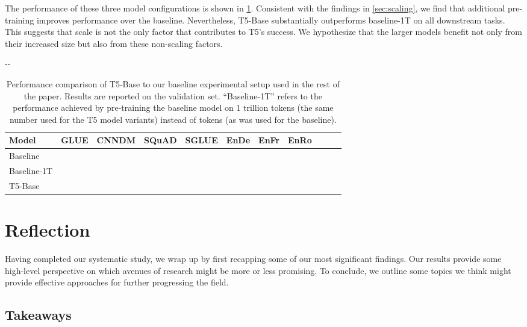 \documentclass[twoside,11pt]{article}
\newlength{\offsetpage}
\newenvironment{widepage}{\begin{adjustwidth}{-\offsetpage}{-\offsetpage}\addtolength{\textwidth}{2\offsetpage}}{\end{adjustwidth}}
\newcommand{\bsl}{\makebox[0pt][r]{\raisebox{0.05em}{}}}
\begin{document}
The performance of these three model configurations is shown in \cref{tab:insight_impact}.
Consistent with the findings in \cref{sec:scaling}, we find that additional pre-training improves performance over the baseline.
Nevertheless, T5-Base substantially outperforms baseline-1T on all downstream tasks.
This suggests that scale is not the only factor that contributes to T5's success.
We hypothesize that the larger models benefit not only from their increased size but also from these non-scaling factors.

\begin{table}
\footnotesize
\begin{widepage}
\centering
\begin{tabular}{l c c c c c c c c c c}
\toprule
    Model          & GLUE        & CNNDM       & SQuAD       & SGLUE       & EnDe        & EnFr        & EnRo    \\
\midrule
    \bsl Baseline  &      &      &      &      &      &      &  \\
    Baseline-1T    &      &      &      &      &      &      &  \\
    T5-Base        &  &  &  &  &  &  &  \\
\bottomrule
\end{tabular}
\end{widepage}
\caption{
Performance comparison of T5-Base to our baseline experimental setup used in the rest of the paper.
Results are reported on the validation set.
``Baseline-1T'' refers to the performance achieved by pre-training the baseline model on 1 trillion tokens (the same number used for the T5 model variants) instead of  tokens (as was used for the baseline).
}
\label{tab:insight_impact}
\end{table}

\section{Reflection}
\label{sec:conclusion}

Having completed our systematic study, we wrap up by first recapping some of our most significant findings.
Our results provide some high-level perspective on which avenues of research might be more or less promising.
To conclude, we outline some topics we think might provide effective approaches for further progressing the field.

\subsection{Takeaways}
\end{document}
